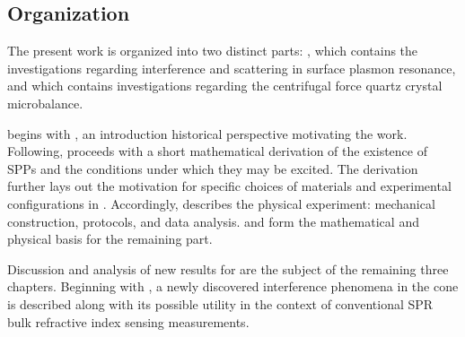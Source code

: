 %
%

\subsection*{Organization}

The present work is organized into two distinct parts: ,
which contains the investigations regarding interference and scattering in
surface plasmon resonance, and  which contains
investigations regarding the centrifugal force quartz crystal microbalance.

 begins with , an introduction
historical perspective motivating the work.  Following,
 proceeds with a short mathematical derivation of the
existence of SPPs and the conditions under which they may be excited.  The
derivation further lays out the motivation for specific choices of
materials and experimental configurations in .
Accordingly,  describes the physical experiment:
mechanical construction, protocols, and data analysis.
 and  form the mathematical
and physical basis for the remaining part.

Discussion and analysis of new results for  are the subject of
the remaining three chapters.  Beginning with , a
newly discovered interference phenomena in the cone is described along with its
possible utility in the context of conventional SPR bulk refractive index
sensing measurements.

